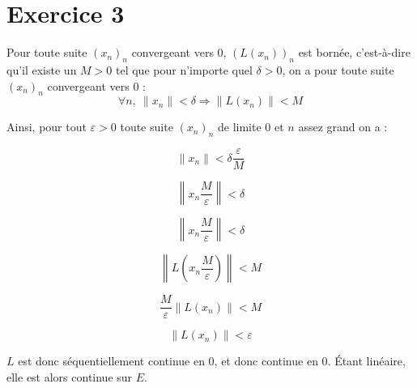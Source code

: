 \documentclass[]{article}
\theoremstyle{remark}
\theoremstyle{definition}
\begin{document}
\section*{Exercice 3}

Pour toute suite $(x_n)_n$ convergeant vers 0, $(L(x_n))_n$ est bornée, c'est-à-dire qu'il existe un $M > 0$ tel que pour n'importe quel $\delta > 0$, on a pour toute suite $(x_n)_n$ convergeant vers 0 :
$$\forall n, ~ \|x_n\| < \delta \Longrightarrow \|L(x_n)\| < M$$

Ainsi, pour tout $\varepsilon > 0$ toute suite $(x_n)_n$ de limite 0 et $n$ assez grand on a :

$$\|x_n\| < \delta \frac{\varepsilon}{M}$$

$$\left\|x_n \frac{M}{\varepsilon}\right\| < \delta $$

$$\left\|x_n \frac{M}{\varepsilon}\right\| < \delta $$

$$\left\|L\left(x_n \frac{M}{\varepsilon}\right)\right\| < M$$

$$\frac{M}{\varepsilon} \left\|L\left(x_n\right)\right\| < M$$

$$\left\|L\left(x_n\right)\right\| < \varepsilon$$

$L$ est donc séquentiellement continue en 0, et donc continue en 0. Étant linéaire, elle est alors continue sur $E$.
\end{document}
